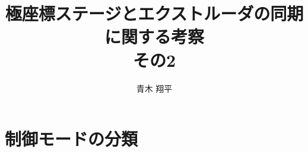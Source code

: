 \documentclass[twocolumn,oneside,a4paper]{article}
\title{極座標ステージとエクストルーダの同期に関する考察 \\その2}
\author{青木 翔平}
\begin{document}
\maketitle

\section{制御モードの分類}
%
\end{document}

